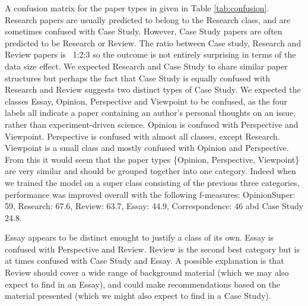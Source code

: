 \documentclass{svmult}
\begin{document}
A confusion matrix for the paper types in given in Table
\ref{tab:confusion}. Research papers are usually predicted to belong
to the Research class, and are sometimes confused with Case
Study. However, Case Study papers are often predicted to be Research
or Review. The ratio between Case study, Research and Review papers is
~1:2:3 so the outcome is not entirely surprising in terms of the data
size effect. We expected Research and Case Study to share similar
paper structures but perhaps the fact that Case Study is equally
confused with Research and Review suggests two distinct types of Case
Study.  We expected the classes Essay, Opinion, Perspective and
Viewpoint to be confused, as the four labels all indicate a paper
containing an author's personal thoughts on an issue, rather than
experiment-driven science. Opinion is confused with Perspective and
Viewpoint. Perspective is confused with almost all classes, except
Research. Viewpoint is a small class and mostly confused with Opinion
and Perspective. From this it would seem that the paper types
\{Opinion, Perspective, Viewpoint\} are very similar and should be
grouped together into one category. Indeed when we trained the model
on a super class consisting of the previous three categories,
performance was improved overall with the following f-measures:
OpinionSuper: 59, Research: 67.6, Review: 63.7, Essay: 44.9,
Correspondence: 46 abd Case Study 24.8.

Essay appears to be distinct enought to justify a class of its own.
Essay is confused with Perspective and Review. Review is the second
best category but is at times confused with Case Study and Essay. A
possible explanation is that Review should cover a wide range of
background material (which we may also expect to find in an Essay),
and could make recommendations based on the material presented (which
we might also expect to find in a Case Study).
\end{document}
